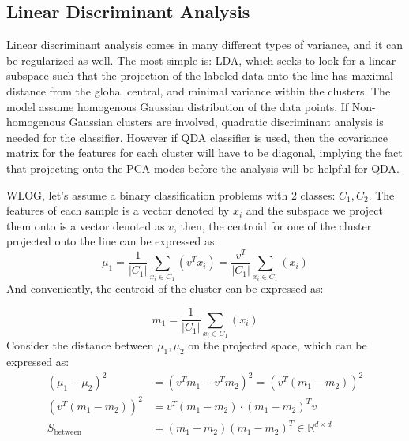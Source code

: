 \documentclass{article}
\begin{document}
    \subsection{Linear Discriminant Analysis}
        \hspace{1.1em}
        Linear discriminant analysis comes in many different types of variance, and it can be regularized as well. The most simple is: LDA, which seeks to look for a linear subspace such that the projection of the labeled data onto the line has maximal distance from the global central, and minimal variance within the clusters. The model assume homogenous Gaussian distribution of the data points. If Non-homogenous Gaussian clusters are involved, quadratic discriminant analysis is needed for the classifier. However if QDA classifier is used, then the covariance matrix for the features for each cluster will have to be diagonal, implying the fact that projecting onto the PCA modes before the analysis will be helpful for QDA.  
        \par
        WLOG, let's assume a binary classification problems with 2 classes: $C_1, C_2$. The features of each sample is a vector denoted by $x_i$ and the subspace we project them onto is a vector denoted as $v$, then, the centroid for one of the cluster projected onto the line can be expressed as\cite{lda}:
        \begin{equation*}\tag{1}\label{eqn:1}
            \mu_1 = \frac{1}{|C_1|} \sum_{x_i \in C_1}^{}\left(
                v^Tx_i
            \right) = \frac{v^T}{|C_1|} \sum_{x_i\in C_1}^{}\left(
                x_i
            \right)
        \end{equation*}
        And conveniently, the centroid of the cluster can be expressed as: 
        \par
        \begin{equation*}\tag{2}\label{eqn:2}
            m_1 = \frac{1}{|C_1|} \sum_{x_i\in C_1}^{}\left(
                x_i
            \right)
        \end{equation*}
        Consider the distance between $\mu_1, \mu_2$ on the projected space, which can be expressed as: 
        \begin{align*}\tag{3}\label{eqn:3}
            (\mu_1 - \mu_2)^2 &= (v^Tm_1 - v^Tm_2)^2 = (v^T(m_1 - m_2))^2 
            \\
            (v^T(m_1 - m_2))^2  &= v^T(m_1 - m_2)\cdot (m_1 - m_2)^Tv
            \\
            S_\text{between} &= (m_1 - m_2)(m_1 - m_2)^T\in \mathbb{R}^{d\times d}
        \end{align*}
\end{document}
